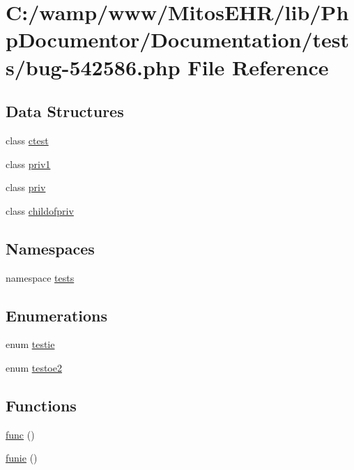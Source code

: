 \hypertarget{bug-542586_8php}{\section{\-C\-:/wamp/www/\-Mitos\-E\-H\-R/lib/\-Php\-Documentor/\-Documentation/tests/bug-\/542586.php \-File \-Reference}
\label{bug-542586_8php}
}
\subsection*{\-Data \-Structures}
\begin{DoxyCompactItemize}
\item 
class \hyperlink{classctest}{ctest}
\item 
class \hyperlink{classpriv1}{priv1}
\item 
class \hyperlink{classpriv}{priv}
\item 
class \hyperlink{classchildofpriv}{childofpriv}
\end{DoxyCompactItemize}
\subsection*{\-Namespaces}
\begin{DoxyCompactItemize}
\item 
namespace \hyperlink{namespacetests}{tests}
\end{DoxyCompactItemize}
\subsection*{\-Enumerations}
\begin{DoxyCompactItemize}
\item 
enum \hyperlink{bug-542586_8php_ae8820e1bc765128429b46389dff348f0}{testie} 
\item 
enum \hyperlink{bug-542586_8php_a9b0a4659f3ddf8cd6d765aa214c68455}{testoe2} 
\end{DoxyCompactItemize}
\subsection*{\-Functions}
\begin{DoxyCompactItemize}
\item 
\hyperlink{bug-542586_8php_a17c6e659a89c18fa9459ec5341063fb8}{func} ()
\item 
\hyperlink{bug-542586_8php_a083b1e23466ae587ca0b16d8f39dd717}{funie} ()
\end{DoxyCompactItemize}


